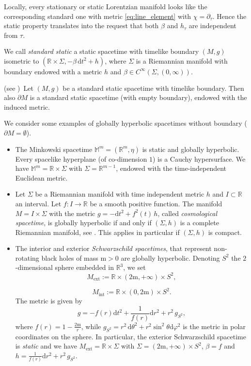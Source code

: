 Locally, every stationary or static Lorentzian manifold looks like the corresponding standard one with metric \eqref{eq:line_element} with $\chi=\partial_\tau$. Hence the static property translates into the request that both $\beta$ and $h_\tau$ are independent from $\tau$.

\begin{Definition}\label{Def: standard static}
	We call \emph{standard static} a static spacetime with timelike boundary $(M,g)$ isometric to $(\mathbb{R}\times\Sigma,-\beta\,\mathrm{d}t^2+h)$, where $\Sigma$ is a Riemannian manifold with boundary endowed with a metric $h$ and $\beta\in C^\infty(\Sigma,(0,\infty))$.
\end{Definition}
\begin{corollary} (see \cite[Cor. 2]{Dappiaggi-Drago-Ferreira-19})\
	Let $(M,g)$ be a standard static spacetime with timelike boundary. Then also $\partial M$ is a standard static spacetime (with empty boundary), endowed with the induced metric.
\end{corollary}

\begin{Example}
	We consider some examples of globally hyperbolic spacetimes without boundary ($\partial M=\emptyset$).
	\begin{itemize}
		\item The Minkowski spacetime $\mathbb{M}^m=(\mathbb{R}^m,\eta)$ is static and globally hyperbolic. Every spacelike hyperplane (of co-dimension $1$) is a Cauchy hypersurface. We have $\mathbb{M}^m=\mathbb{R}\times \Sigma$ with $\Sigma = \mathbb{R}^{m-1}$, endowed with the time-independent Euclidean metric.
		\item Let $\Sigma$ be a Riemannian manifold with time independent metric $h$ and $I\subset\mathbb{R}$ an interval. Let $f: I\to\mathbb{R}$	be a smooth positive function. The manifold $M=I \times \Sigma$ with the metric $g = -\mathrm{d} t^2 + f^2(t)\, h$, called \emph{cosmological spacetime}, is globally hyperbolic if and only if $(\Sigma,h)$ is a complete Riemannian manifold, see \cite[Lem A.5.14]{Baer-Ginoux-Pfaffle-07}. This applies in particular if $(\Sigma,h)$ is compact.
		\item The interior and exterior \emph{Schwarzschild spacetimes}, that represent non-rotating black holes of mass $\mathrm{m}>0$ are globally hyperbolic.
		Denoting $S^2$ the $2$-dimensional sphere embedded in $\mathbb{R}^3$, we set
		\[	 M_{\text{ext}}:=\mathbb{R}\times(2\mathrm{m},+\infty)	\times S^2,	\] 
		
		\[	 M_{\text{int}}:=\mathbb{R}\times(0,2\mathrm{m})	\times S^2.	\] 
		The metric is given by
		\[	g=-f(r) \mathrm{d} t^2+\frac{1}{f(r)} \mathrm{d} r^2	+r^2\,g_{S^2},	\]
		where $f(r)=1-\frac{2\mathrm{m}}{r}$, while $g_{S^2}=r^2\, \mathrm{d}\theta^2+r^2\sin^2\theta \mathrm{d}\varphi^2$ is the metric in polar coordinates on the sphere. In particular, the exterior Schwarzschild spacetime is \emph{static} and we have $ M_{\text{ext}}=\mathbb{R}\times \Sigma$ with $\Sigma=(2\mathrm{m},+\infty)\times S^2$, $\beta=f$ and $h=\frac{1}{f(r)} \mathrm{d} r^2	+r^2\,g_{S^2}$.
	\end{itemize}
\end{Example}

